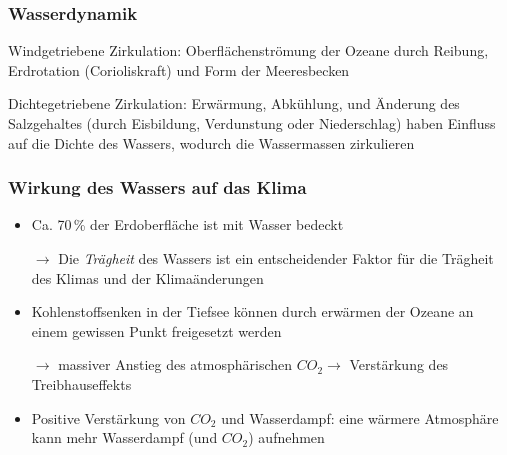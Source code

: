 \begin{frame}
	\frametitle{Wasserdynamik} %
	\begin{block}{Windgetriebene Zirkulation: } %
		Oberflächenströmung der Ozeane durch Reibung, Erdrotation (Corioliskraft) und Form der Meeresbecken 
	\end{block}
	\begin{block}{Dichtegetriebene Zirkulation: }  %
		Erwärmung, Abkühlung, und Änderung des Salzgehaltes (durch Eisbildung, Verdunstung oder Niederschlag) haben Einfluss auf die Dichte des Wassers, wodurch die Wassermassen zirkulieren
	\end{block}
	
\end{frame}


\begin{frame}
	\frametitle{Wirkung des Wassers auf das Klima}
	\begin{itemize}
	\item Ca. 70\,\% der Erdoberfläche ist mit Wasser bedeckt
	\item [$\rightarrow$] Die \textit{Trägheit} des Wassers ist ein entscheidender Faktor für die Trägheit des Klimas und der Klimaänderungen %
	\item Kohlenstoffsenken in der Tiefsee können durch erwärmen der Ozeane an einem gewissen Punkt freigesetzt werden
	\item[$\rightarrow$] massiver Anstieg des atmosphärischen $CO_2 \rightarrow$ Verstärkung des Treibhauseffekts
	\item Positive Verstärkung von $CO_2$ und Wasserdampf: eine wärmere Atmosphäre kann mehr Wasserdampf (und $CO_2$) aufnehmen
	\end{itemize}
\end{frame}

